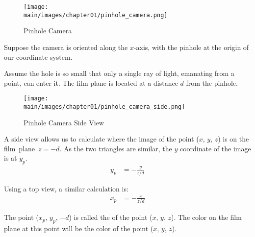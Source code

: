 \documentclass[\main/notes.tex]{subfiles}
\begin{document}
        \begin{example}
          \begin{wrapfigure}[7]{r}{0.5\textwidth}
            \begin{center}
              \texttt{[image: \\main/images/chapter01/pinhole\_camera.png]}
            \end{center}
            \caption{Pinhole Camera}
          \end{wrapfigure}

          Suppose the camera is oriented along the \mbox{$x$-axis},
          with the pinhole at the origin of our coordinate system.

          Assume the hole is so small that only a single ray of light,
          emanating from a point, can enter it.
          The film plane is located at a distance $d$ from the pinhole.

          \vspace{4.5em}
          \pagebreak

          \begin{wrapfigure}[11]{l}{0.5\textwidth}
            \vspace{-20pt}
            \begin{center}
              \texttt{[image: \\main/images/chapter01/pinhole\_camera\_side.png]}
            \end{center}
            \vspace{-10pt}
            \caption{Pinhole Camera Side View}
          \end{wrapfigure}

          A side view allows us to calculate where the image of the point ($x$, $y$, $z$) is
          on the film~plane~$z = -d$.
          As the two triangles are similar, the $y$ coordinate of the image is at $y_p$.
          \begin{align*}
            y_p &= -\frac{y}{z/d}
          \end{align*}

          Using a top view, a similar calculation is:
          \begin{align*}
            x_p &= -\frac{x}{z/d}
          \end{align*}

          The point ($x_p$, $y_p$, $-d$) is called the 
          of the point ($x$, $y$, $z$).
          The color on the film plane at this point will be the color of the point ($x$, $y$, $z$).
        \end{example}
\end{document}
